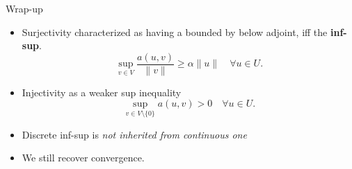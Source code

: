\documentclass[aspectratio=169]{beamer}
\begin{document}
\begin{frame}{Wrap-up}
    \begin{itemize}
        \item Surjectivity characterized as having a bounded by below adjoint, iff the \textbf{inf-sup}.
                $$ \sup_{v\in V} \frac{a(u,v)}{\|v\|} \geq \alpha \| u \| \quad \forall u \in U .$$
        \item Injectivity as a weaker sup inequality 
                $$ \sup_{v\in V\setminus\{0\}}a(u,v) > 0 \quad\forall u \in U. $$
        \item Discrete inf-sup is \emph{not inherited from continuous one}
        \item We still recover convergence.
    \end{itemize}
\end{frame}

\begin{frame}
    \titlepage
\end{frame}
\end{document}
